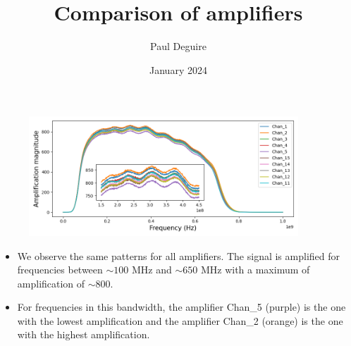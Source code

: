 \documentclass{beamer}
\title{Comparison of amplifiers}
\author{Paul Deguire}
\institute{Interview Multimessenger School}
\date{January 2024}
\begin{document}
\frame{\titlepage}

\begin{frame}
\frametitle{}
\begin{figure}
    \centering
    \includegraphics[width=0.9\textwidth]{../figures/all_amp.png}
\end{figure}
\begin{itemize}
    \item We observe the same patterns for all amplifiers. The signal is amplified for frequencies between $\sim100$ MHz and $\sim650$ MHz with a maximum of amplification of $\sim800$.
    \item For frequencies in this bandwidth, the amplifier Chan\_5 (purple) is the one with the lowest amplification and the amplifier Chan\_2 (orange) is the one with the highest amplification.
\end{itemize}
\end{frame}
\end{document}
